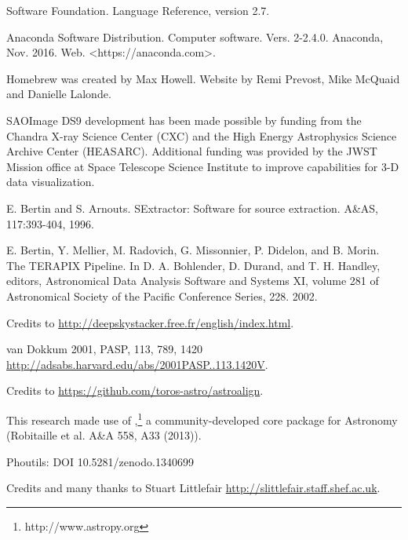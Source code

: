 \documentclass[a4paper, 11pt, fleqn]{memoir}
\begin{document}
Software Foundation.
Language Reference, version 2.7.

Anaconda Software Distribution.
Computer software.
Vers.
2-2.4.0.
Anaconda, Nov.
2016.
Web.
<https://anaconda.com>.

Homebrew was created by Max Howell.
Website by Remi Prevost, Mike McQuaid and Danielle Lalonde.

SAOImage DS9 development has been made possible by funding from the Chandra X-ray Science Center (CXC) and the High Energy Astrophysics Science Archive Center (HEASARC).
Additional funding was provided by the JWST Mission office at Space Telescope Science Institute to improve capabilities for 3-D data visualization.

E.
Bertin and S.
Arnouts.
SExtractor: Software for source extraction.
A\&AS, 117:393-404, 1996.

E.
Bertin, Y.
Mellier, M.
Radovich, G.
Missonnier, P.
Didelon, and B.
Morin.
The TERAPIX Pipeline.
In D.
A.
Bohlender, D.
Durand, and T.
H.
Handley, editors, Astronomical Data Analysis Software and Systems XI, volume 281 of Astronomical Society of the Pacific Conference Series, 228.
2002.

Credits to \url{http://deepskystacker.free.fr/english/index.html}.

van Dokkum 2001, PASP, 113, 789, 1420
\url{http://adsabs.harvard.edu/abs/2001PASP..113.1420V}.

Credits to \url{https://github.com/toros-astro/astroalign}.

This research made use of ,\footnote{http://www.astropy.org} a community-developed core  package for Astronomy (Robitaille et al.
A\&A 558, A33 (2013)).

Phoutils: DOI 10.5281/zenodo.1340699

Credits and many thanks to Stuart Littlefair \url{http://slittlefair.staff.shef.ac.uk}.



\end{document}
